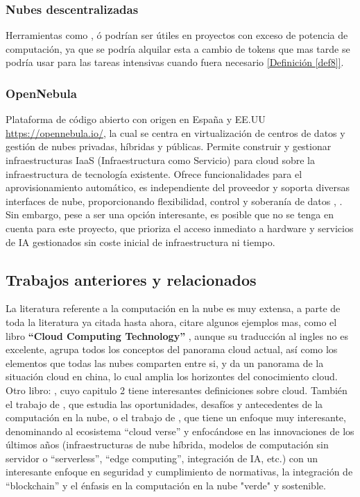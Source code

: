 \subsubsection*{Nubes descentralizadas}
Herramientas como \citep{GolemNetwork}, \citep{akashCloud} ó \citep{rendernetwork} podrían ser útiles en proyectos con exceso de potencia de computación, ya que se podría alquilar esta a cambio de tokens que mas tarde se podría usar para las tareas intensivas cuando fuera necesario \hyperref[def8]{[Definición \ref*{def8}]}.

\subsubsection*{OpenNebula}
Plataforma de código abierto con origen en España y EE.UU \url{https://opennebula.io/}, la cual se centra en virtualización de centros de datos y gestión de nubes privadas, híbridas y públicas. Permite construir y gestionar infraestructuras IaaS (Infraestructura como Servicio) para cloud sobre la infraestructura de tecnología existente. Ofrece funcionalidades para el aprovisionamiento automático, es independiente del proveedor y soporta diversas interfaces de nube, proporcionando flexibilidad, control y soberanía de datos \citep{OpenNebula2014Kumar}, \citep{PrivateIaaSComparative2016}. Sin embargo, pese a ser una opción interesante, es posible que no se tenga en cuenta para este proyecto, que prioriza el acceso inmediato a hardware y servicios de IA gestionados sin coste inicial de infraestructura ni tiempo. \\
 
\subsection{Trabajos anteriores y relacionados}

La literatura referente a la computación en la nube es muy extensa, a parte de toda la literatura ya citada hasta ahora, citare algunos ejemplos mas, como el libro \textbf{``Cloud Computing Technology''} \citep{huawei2023cloud}, aunque su traducción al ingles no es excelente, agrupa todos los conceptos del panorama cloud actual, así como los elementos que todas las nubes comparten entre si, y da un panorama de la situación cloud en china, lo cual amplia los horizontes del conocimiento cloud. Otro libro: \citep{Fowdur2021}, cuyo capitulo 2 tiene interesantes definiciones sobre cloud. También el trabajo de \citep{nigro2022}, que estudia las oportunidades, desafíos y antecedentes de la computación en la nube, o el trabajo de \citep{bommala2024}, que tiene un enfoque muy interesante, denominando al ecosistema ``cloud verse'' y enfocándose en las innovaciones de los últimos años (infraestructuras de nube híbrida, modelos de computación sin servidor o ``serverless'', ``edge computing'', integración de IA, etc.) con un interesante enfoque en seguridad y cumplimiento de normativas, la integración de ``blockchain'' y el énfasis en la computación en la nube "verde" y sostenible. 

